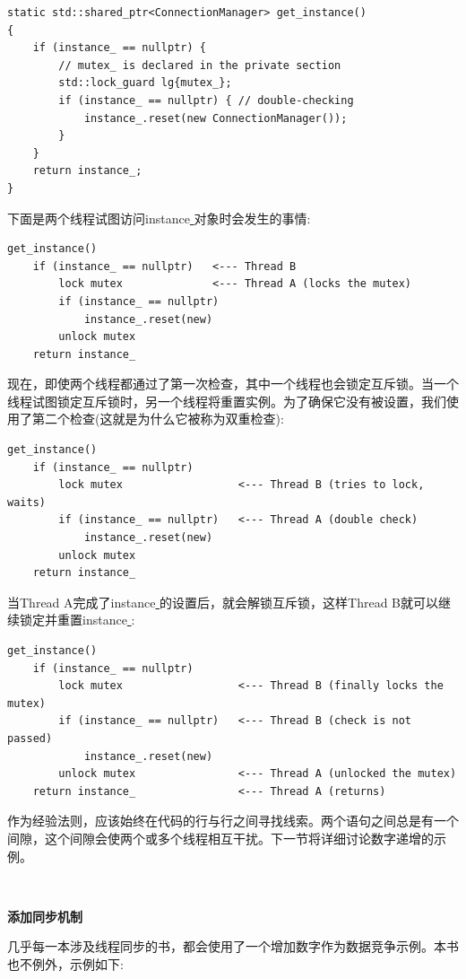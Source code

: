 \begin{lstlisting}[caption={}]
static std::shared_ptr<ConnectionManager> get_instance()
{
	if (instance_ == nullptr) {
		// mutex_ is declared in the private section
		std::lock_guard lg{mutex_};
		if (instance_ == nullptr) { // double-checking
			instance_.reset(new ConnectionManager());
		}
	}
	return instance_;
}
\end{lstlisting}

下面是两个线程试图访问instance\underline{ }对象时会发生的事情: \par

\begin{lstlisting}[caption={}]
get_instance()
	if (instance_ == nullptr) 	<--- Thread B
		lock mutex 				<--- Thread A (locks the mutex)
		if (instance_ == nullptr)
			instance_.reset(new)
		unlock mutex
	return instance_
\end{lstlisting}

现在，即使两个线程都通过了第一次检查，其中一个线程也会锁定互斥锁。当一个线程试图锁定互斥锁时，另一个线程将重置实例。为了确保它没有被设置，我们使用了第二个检查(这就是为什么它被称为双重检查): \par

\begin{lstlisting}[caption={}]
get_instance()
	if (instance_ == nullptr)
		lock mutex 					<--- Thread B (tries to lock, waits)
		if (instance_ == nullptr) 	<--- Thread A (double check)
			instance_.reset(new)
		unlock mutex
	return instance_
\end{lstlisting}

当Thread A完成了instance\underline{ }的设置后，就会解锁互斥锁，这样Thread B就可以继续锁定并重置instance\underline{ }: \par

\begin{lstlisting}[caption={}]
get_instance()
	if (instance_ == nullptr)
		lock mutex 					<--- Thread B (finally locks the mutex)
		if (instance_ == nullptr) 	<--- Thread B (check is not passed)
			instance_.reset(new)
		unlock mutex 				<--- Thread A (unlocked the mutex)
	return instance_ 				<--- Thread A (returns)
\end{lstlisting}

作为经验法则，应该始终在代码的行与行之间寻找线索。两个语句之间总是有一个间隙，这个间隙会使两个或多个线程相互干扰。下一节将详细讨论数字递增的示例。 \par

\noindent\textbf{}\ \par
\textbf{添加同步机制} \ \par
几乎每一本涉及线程同步的书，都会使用了一个增加数字作为数据竞争示例。本书也不例外，示例如下: \par

